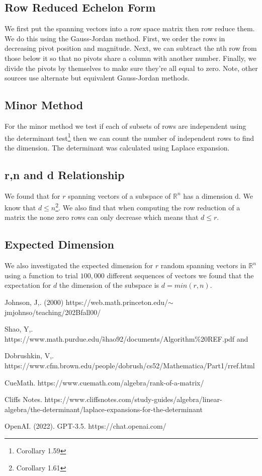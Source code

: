 \documentclass{article}
\begin{document}
\subsection*{Row Reduced Echelon Form}
We first put the spanning vectors into a row space matrix then row reduce them. We do this using the Gauss-Jordan method\cite{Dobrushkin}. First, we order the rows in decreasing pivot position and magnitude. Next, we can subtract the nth row from those below it so that no pivots share a column with another number. Finally, we divide the pivots by themselves to make sure they're all equal to zero. Note, other sources\cite{CueMath} use alternate but equivalent Gauss-Jordan methods.

\subsection*{Minor Method}
For the minor method we test if each of subsets of rows are independent using the determinant test\footnote{Corollary 1.59} then we can count the number of independent rows to find the dimension\cite{CueMath}. The determinant was calculated using Laplace expansion\cite{CliffsNotes}\cite{OpenAI}. 

\subsection*{r,n and d Relationship}
We found that for $r$ spanning vectors of a subspace of $\mathbb{R}^n$ has a dimension d. We know that $d \leq n$\footnote{Corollary 1.61}. We also find that when computing the row reduction of a matrix the none zero rows can only decrease which means that $d\leq r$.

\subsection*{Expected Dimension}
We also investigated the expected dimension for $r$ random spanning vectors in $\mathbb{R}^n$ using a function to trial $100,000$ different sequences of vectors we found that the expectation for $d$ the dimension of the subspace is $d = min(r,n)$. 

\break

\begin{thebibliography}{11}

Johnson, J,. (2000)
https://web.math.princeton.edu/$\sim$jmjohnso/teaching/202Bfall00/

Shao, Y,. 
https://www.math.purdue.edu/\~shao92/documents/Algorithm\%20REF.pdf and 

Dobrushkin, V,. https://www.cfm.brown.edu/people/dobrush/cs52/Mathematica/Part1/rref.html

CueMath. https://www.cuemath.com/algebra/rank-of-a-matrix/

Cliffs Notes. https://www.cliffsnotes.com/study-guides/algebra/linear-algebra/the-determinant/laplace-expansions-for-the-determinant

OpenAI. (2022). GPT-3.5. https://chat.openai.com/

\end{thebibliography}
\end{document}
